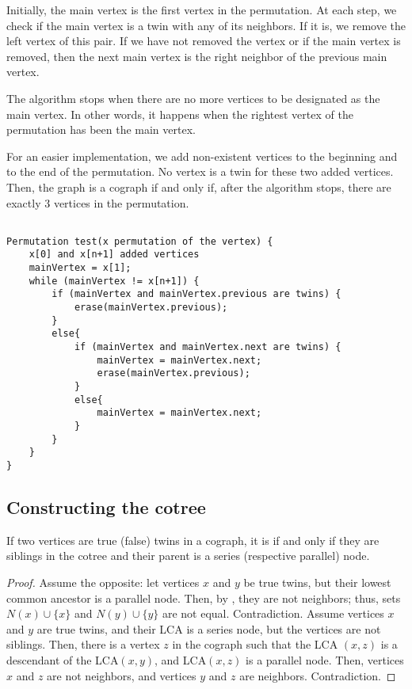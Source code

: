 Initially, the main vertex is the first vertex in the permutation. At each step, we check if the main vertex is a twin with any of its neighbors. If it is, we remove the left vertex of this pair. If we have not removed the vertex or if the main vertex is removed, then the next main vertex is the right neighbor of the previous main vertex.

The algorithm stops when there are no more vertices to be designated as the main vertex. In other words, it happens when the rightest vertex of the permutation has been the main vertex. 

For an easier implementation, we add non-existent vertices to the beginning and to the end of the permutation. No vertex is a twin for these two added vertices. Then, the graph is a cograph if and only if, after the algorithm stops, there are exactly 3 vertices in the permutation.
\begin{verbatim}

Permutation test(x permutation of the vertex) {
    x[0] and x[n+1] added vertices
    mainVertex = x[1];
    while (mainVertex != x[n+1]) {
        if (mainVertex and mainVertex.previous are twins) {
            erase(mainVertex.previous);
        }
        else{
            if (mainVertex and mainVertex.next are twins) {
                mainVertex = mainVertex.next;
                erase(mainVertex.previous);
            }
            else{
                mainVertex = mainVertex.next;
            }
        }
    }
}
\end{verbatim}
\subsection{Constructing the cotree}
\label{Cotree construction}
\label{Constructing the cotree}
\begin{theorem}
    If two vertices are true (false) twins in a cograph, it is if and only if they are siblings in the cotree and their parent is a series (respective parallel) node.
    \label{Theorem on twins in the cograph}
\end{theorem}
\begin{proof}
Assume the opposite: let vertices $x$ and $y$ be true twins, but their lowest common ancestor is a parallel node. Then, by , they are not neighbors; thus, sets $N(x) \cup \{x\}$ and $N(y) \cup \{y\}$ are not equal. Contradiction.
Assume vertices $x$ and $y$ are true twins, and their LCA is a series node, but the vertices are not siblings. Then, there is a vertex $z$ in the cograph such that the LCA $(x,z)$ is a descendant of the LCA$(x,y)$, and LCA$(x,z)$ is a parallel node. Then, vertices $x$ and $z$ are not neighbors, and vertices $y$ and $z$ are neighbors. Contradiction.
\end{proof}

